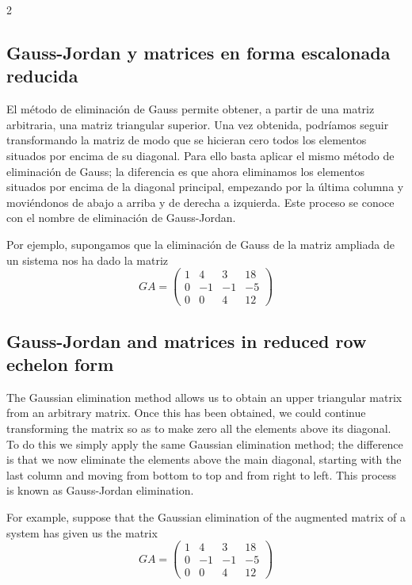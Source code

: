 \begin{paracol}{2}
\subsection{Gauss-Jordan y matrices en forma escalonada reducida}
El método de eliminación de Gauss permite obtener, a partir de una matriz arbitraria, una matriz triangular superior. Una vez obtenida, podríamos seguir transformando la matriz de modo que se hicieran cero todos los elementos situados por encima de su diagonal. Para ello basta aplicar el mismo método de eliminación de Gauss; la diferencia es que ahora eliminamos los elementos situados por encima de la diagonal principal, empezando por la última columna y moviéndonos de abajo a arriba y de derecha a izquierda. Este proceso se conoce con el nombre de eliminación de Gauss-Jordan.

Por ejemplo, supongamos que la eliminación de Gauss de la matriz ampliada de un sistema nos ha dado la matriz
\begin{equation*}
GA=\begin{pmatrix}
1&     4&     3&    18\\
 0&    -1&    -1&    -5\\
 0&     0&     4&    12
\end{pmatrix}
\end{equation*}

\switchcolumn

\subsection{Gauss-Jordan and matrices in reduced row echelon form}
The Gaussian elimination method allows us to obtain an upper triangular matrix from an arbitrary matrix. Once this has been obtained, we could continue transforming the matrix so as to make zero all the elements above its diagonal. To do this we simply apply the same Gaussian elimination method; the difference is that we now eliminate the elements above the main diagonal, starting with the last column and moving from bottom to top and from right to left. This process is known as Gauss-Jordan elimination.

For example, suppose that the Gaussian elimination of the augmented matrix of a system has given us the matrix
\begin{equation*}
GA=\begin{pmatrix}
1&     4&     3&    18\\
 0&    -1&    -1&    -5\\
 0&     0&     4&    12
\end{pmatrix}
\end{equation*}


\end{paracol}
